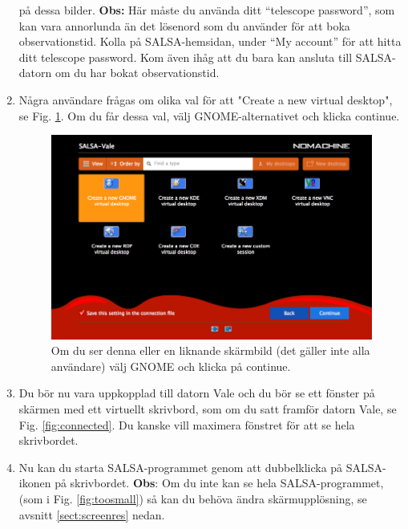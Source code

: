 \begin{enumerate}
	på dessa bilder. 
{\bf Obs:} Här måste du använda ditt ``telescope password'', som kan vara annorlunda än 
det lösenord som du använder för att boka observationstid. Kolla på SALSA-hemsidan, under
``My account'' för att hitta ditt telescope password. Kom även ihåg att du bara kan ansluta
till SALSA-datorn om du har bokat observationstid. 
\item Några användare frågas om olika val för att "Create a new virtual desktop", se 
	Fig. \ref{fig:virtual}. Om du får dessa val, välj GNOME-alternativet och klicka continue.
\begin{figure}[H]
    \centering
    \includegraphics[height=0.5\textwidth]{../figures/nomachinefigs/fig_virtual.png}
	\caption{Om du ser denna eller en liknande skärmbild (det gäller inte alla användare)
		välj GNOME och klicka på continue.
	}
    \label{fig:virtual}
\end{figure}
\item Du bör nu vara uppkopplad till datorn Vale och du bör se ett fönster på skärmen 
	med ett virtuellt skrivbord, som om du satt framför datorn Vale, se Fig. 
	\ref{fig:connected}.  Du kanske vill maximera fönstret för att se hela skrivbordet.
\item Nu kan du starta SALSA-programmet genom att dubbelklicka på SALSA-ikonen på
	skrivbordet. {\bf Obs}: Om du inte kan se hela SALSA-programmet, 
	(som i Fig. \ref{fig:toosmall}) så kan du behöva ändra skärmupplösning,
	se avsnitt 	\ref{sect:screenres} nedan.
\end{enumerate}

